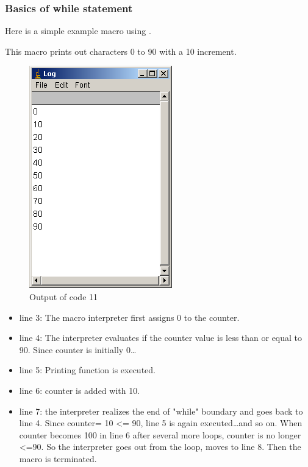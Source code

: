 \subsubsection{Basics of while statement}
Here is a simple example macro using .

This macro prints out characters 0 to 90 with a 10 increment. 

\begin{figure}[htbp]
\begin{center}
\includegraphics[scale=0.4]{fig/fig2331_Code11out.png}
\caption{Output of code 11}
\label{fig:code11 output}
\end{center}
\end{figure} 

\begin{itemize}
\item line 3: The macro interpreter first assigns 0 to the counter.
\item line 4: The interpreter evaluates if the counter value is less than or equal to 90. Since counter is initially 0\ldots 
\item line 5: Printing function is executed. 
\item line 6: counter is added with 10. 
\item line 7: the interpreter realizes the end of "while" boundary and goes back to line 4. Since counter= 10 <= 90, line 5 is again executed\ldots and so on. When counter becomes 100 in line 6 after several more loops, counter is no longer <=90. So the interpreter goes out from the loop, moves to line 8. Then the macro is terminated.
\end{itemize}

